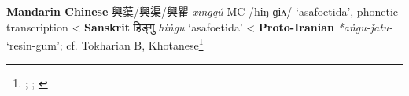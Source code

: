 \begin{etymology}\label{ety:xingqu}
\textbf{Mandarin Chinese} {興蕖/興渠/興瞿} \textit{xīngqú} MC /hɨŋ ɡɨʌ/ `asafoetida', phonetic transcription
< \textbf{Sanskrit} {हिङ्गु} \textit{hiṅgu} `asafoetida'
< \textbf{Proto-Iranian} \textit{*aṅgu-ǰatu-} `resin-gum'; cf. Tokharian B, Khotanese\footnote{\textcite{leung_itinerary_2019}; \textcite[353]{laufer_sino-iranica_1919}; \textcite[7]{adams_dictionary_2013}}
\end{etymology}